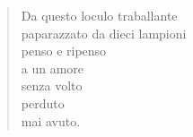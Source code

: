 \begin{verse}
    Da questo loculo traballante\\
    paparazzato da dieci lampioni\\
    penso e ripenso\\
    a un amore\\
    senza volto\\
    perduto\\
    mai avuto.
\end{verse}
